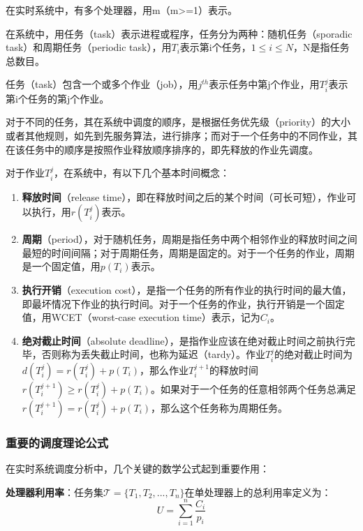 在实时系统中，有多个处理器，用m（m>=1）表示。

在系统中，用任务（task）表示进程或程序，任务分为两种：随机任务（sporadic task）和周期任务（periodic task），用$T_i$表示第i个任务，$1 \leq i \leq N$，N是指任务总数目。

任务（task）包含一个或多个作业（job），用$j^{th}$表示任务中第j个作业，用$T_i^j$表示第i个任务的第j个作业。

对于不同的任务，其在系统中调度的顺序，是根据任务优先级（priority）的大小或者其他规则，如先到先服务算法，进行排序；而对于一个任务中的不同作业，其在该任务中的顺序是按照作业释放顺序排序的，即先释放的作业先调度。

对于作业$T_i^j$，在系统中，有以下几个基本时间概念：

\begin{enumerate}
    \item \textbf{释放时间}（release time），即在释放时间之后的某个时间（可长可短），作业可以执行，用$r(T_i^j)$表示。
    
    \item \textbf{周期}（period），对于随机任务，周期是指任务中两个相邻作业的释放时间之间最短的时间间隔；对于周期任务，周期是固定的。对于一个任务的作业，周期是一个固定值，用$p(T_i)$表示。
    
    \item \textbf{执行开销}（execution cost），是指一个任务的所有作业的执行时间的最大值，即最坏情况下作业的执行时间。对于一个任务的作业，执行开销是一个固定值，用WCET（worst-case execution time）表示，记为$C_i$。
    
    \item \textbf{绝对截止时间}（absolute deadline），是指作业应该在绝对截止时间之前执行完毕，否则称为丢失截止时间，也称为延迟（tardy）。作业$T_i^j$的绝对截止时间为$d(T_i^j) = r(T_i^j) + p(T_i)$，那么作业$T_i^{j+1}$的释放时间$r(T_i^{j+1}) \geq r(T_i^j) + p(T_i)$。如果对于一个任务的任意相邻两个任务总满足$r(T_i^{j+1}) = r(T_i^j) + p(T_i)$，那么这个任务称为周期任务。
\end{enumerate}

\subsubsection{重要的调度理论公式}

在实时系统调度分析中，几个关键的数学公式起到重要作用：

\textbf{处理器利用率}：任务集$\mathcal{T} = \{T_1, T_2, ..., T_n\}$在单处理器上的总利用率定义为：
$$U = \sum_{i=1}^{n} \frac{C_i}{p_i}$$

